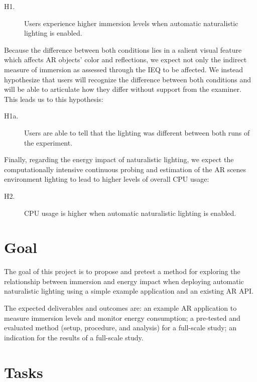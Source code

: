\documentclass[12pt,twoside,english]{article}
\begin{document}
\begin{description}
    \item[H1.] Users experience higher immersion levels when automatic naturalistic lighting is enabled.
\end{description}

Because the difference between both conditions lies in a salient visual feature which affects \gls{AR} objects' color and reflections, we expect not only the indirect measure of immersion as assessed through the \gls{IEQ} to be affected.
We instead hypothesize that users will recognize the difference between both conditions and will be able to articulate how they differ without support from the examiner.
This leads us to this hypothesis:

\begin{description}
    \item[H1a.] Users are able to tell that the lighting was different between both runs of the experiment.
\end{description}

Finally, regarding the energy impact of naturalistic lighting, we expect the computationally intensive continuous probing and estimation of the \gls{AR} scenes environment lighting to lead to higher levels of overall \gls{CPU} usage:

\begin{description}
    \item[H2.] \gls{CPU} usage is higher when automatic naturalistic lighting is enabled.
\end{description}





\section{Goal}
\label{sect:goals}

The goal of this project is to propose and pretest a method for exploring the relationship between immersion and energy impact when deploying automatic naturalistic lighting using a simple example application and an existing \gls{AR} \gls{API}.

The expected deliverables and outcomes are: an example \gls{AR} application to measure immersion levels and monitor energy consumption; a pre-tested and evaluated method (setup, procedure, and analysis) for a full-scale study; an indication for the results of a full-scale study.

\section{Tasks}
\label{sect:tasks}
\end{document}
